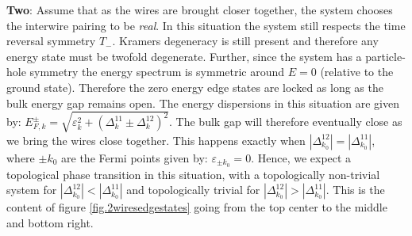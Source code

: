 \textbf{Two}: Assume that as the wires are brought closer together, the system chooses the interwire pairing to be \textit{real}. In this situation the system still respects the time reversal symmetry $T_-$. Kramers degeneracy is still present and therefore any energy state must be twofold degenerate. Further, since the system has a particle-hole symmetry the energy spectrum is symmetric around $E = 0$ (relative to the ground state). Therefore the zero energy edge states are locked as long as the bulk energy gap remains open. The energy dispersions in this situation are given by: $E^{\pm}_{F,k} = \sqrt{\varepsilon^2_k + (\Delta^{11}_k \pm \Delta^{12}_k)^2}$. The bulk gap will therefore eventually close as we bring the wires close together. This happens exactly when $|\Delta^{12}_{k_0}| = |\Delta^{11}_{k_0}|$, where $\pm k_0$ are the Fermi points given by: $\varepsilon_{\pm k_0} = 0$. Hence, we expect a topological phase transition in this situation, with a topologically non-trivial system for $|\Delta^{12}_{k_0}| < |\Delta^{11}_{k_0}|$ and topologically trivial for $|\Delta^{12}_{k_0}| > |\Delta^{11}_{k_0}|$. This is the content of figure \ref{fig.2wiresedgestates} going from the top center to the middle and bottom right. 

